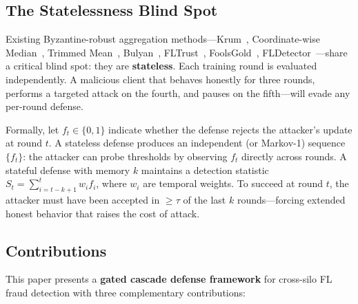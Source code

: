 \documentclass[10pt,journal]{IEEEtran}
\begin{document}
\subsection{The Statelessness Blind Spot}

Existing Byzantine-robust aggregation methods---Krum~\cite{blanchard2017}, Coordinate-wise Median~\cite{yin2018}, Trimmed Mean~\cite{yin2018}, Bulyan~\cite{guerraoui2018}, FLTrust~\cite{cao2021}, FoolsGold~\cite{fung2020}, FLDetector~\cite{zhang2022}---share a critical blind spot: they are \textbf{stateless}. Each training round is evaluated independently. A malicious client that behaves honestly for three rounds, performs a targeted attack on the fourth, and pauses on the fifth---will evade any per-round defense.

Formally, let $f_t \in \{0,1\}$ indicate whether the defense rejects the attacker's update at round $t$. A stateless defense produces an independent (or Markov-1) sequence $\{f_t\}$: the attacker can probe thresholds by observing $f_t$ directly across rounds. A stateful defense with memory $k$ maintains a detection statistic $S_t = \sum_{i=t-k+1}^{t} w_i f_i$, where $w_i$ are temporal weights. To succeed at round $t$, the attacker must have been accepted in $\ge \tau$ of the last $k$ rounds---forcing extended honest behavior that raises the cost of attack.

\subsection{Contributions}
\label{sec:contributions}

This paper presents a \textbf{gated cascade defense framework} for cross-silo FL fraud detection with three complementary contributions:
\end{document}
